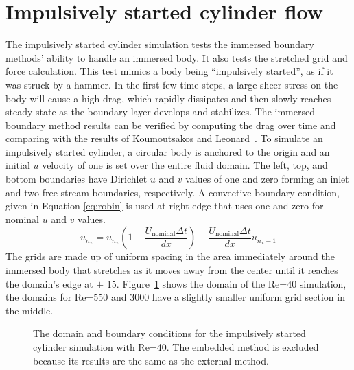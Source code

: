 \section{Impulsively started cylinder flow}
\label{sec:cylinder}
The impulsively started cylinder simulation tests the immersed boundary methods' ability to handle an immersed body. 
It also tests the stretched grid and force calculation. 
This test mimics a body being ``impulsively started'', as if it was struck by a hammer. 
In the first few time steps, a large sheer stress on the body will cause a high drag, which rapidly dissipates and then slowly reaches steady state as the boundary layer develops and stabilizes. 
The immersed boundary method results can be verified by computing the drag over time and comparing with the results of Koumoutsakos and Leonard~\cite{Koumoutsakos:1995bf}. 
To simulate an impulsively started cylinder, a circular body is anchored to the origin and an initial $u$ velocity of one is set over the entire fluid domain. 
The left, top, and bottom boundaries have Dirichlet $u$ and $v$ values of one and zero forming an inlet and two free stream boundaries, respectively. 
A convective boundary condition, given in Equation \eqref{eq:robin} is used at right edge that uses one and zero for nominal $u$ and $v$ values. 
\begin{equation}
u_{n_x}=u_{n_x}\left(1-\frac{U_{\text{nominal}}\Delta t}{dx}\right) + \frac{U_{\text{nominal}}\Delta t}{dx}u_{n_x-1}
\label{eq:robin}
\end{equation}
The grids are made up of uniform spacing in the area immediately around the immersed body that stretches as it moves away from the center until it reaches the domain's edge at $\pm$ 15. 
Figure~\ref{fig:iscylinder} shows the domain of the Re=40 simulation, the domains for Re=550 and 3000 have a slightly smaller uniform grid section in the middle. 
\begin{figure}[!htb]
	\centering
	
	\caption{The domain and boundary conditions for the impulsively started cylinder simulation with Re=40. The embedded method is excluded because its results are the same as the external method.}
	\label{fig:iscylinder}
\end{figure}

